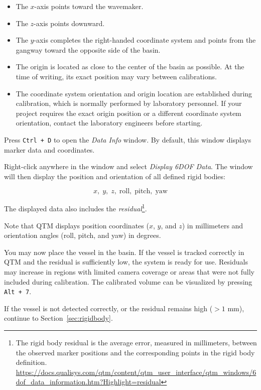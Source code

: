 \documentclass[12pt,a4paper]{article}
\begin{document}
	\begin{itemize}
		\item The $x$-axis points toward the wavemaker.
		\item The $z$-axis points downward.
		\item The $y$-axis completes the right-handed coordinate system and points from the gangway toward the opposite side of the basin.
		\item The origin is located as close to the center of the basin as possible. At the time of writing, its exact position may vary between calibrations.
		\item The coordinate system orientation and origin location are established during calibration, which is normally performed by laboratory personnel. If your project requires the exact origin position or a different coordinate system orientation, contact the laboratory engineers before starting.
	\end{itemize}
	
	Press \texttt{Ctrl + D} to open the \textit{Data Info} window. By default, this window displays marker data and coordinates.
	
	Right-click anywhere in the window and select \textit{Display 6DOF Data}. The window will then display the position and orientation of all defined rigid bodies:
	
	\[
	x,\; y,\; z,\; \text{roll},\; \text{pitch},\; \text{yaw}
	\]
	
	The displayed data also includes the \textit{residual}\footnote{
		The rigid body residual is the average error, measured in millimeters, between the observed marker positions and the corresponding points in the rigid body definition.
		\url{https://docs.qualisys.com/qtm/content/qtm_user_interface/qtm_windows/6dof_data_information.htm?Highlight=residual}
	}.
	
	Note that QTM displays position coordinates ($x$, $y$, and $z$) in millimeters and orientation angles (roll, pitch, and yaw) in degrees.
	
	You may now place the vessel in the basin. If the vessel is tracked correctly in QTM and the residual is sufficiently low, the system is ready for use. Residuals may increase in regions with limited camera coverage or areas that were not fully included during calibration. The calibrated volume can be visualized by pressing \texttt{Alt + 7}.
	
	If the vessel is not detected correctly, or the residual remains high ($>1$ mm), continue to Section~\ref{sec:rigidbody}.
	
\end{document}
